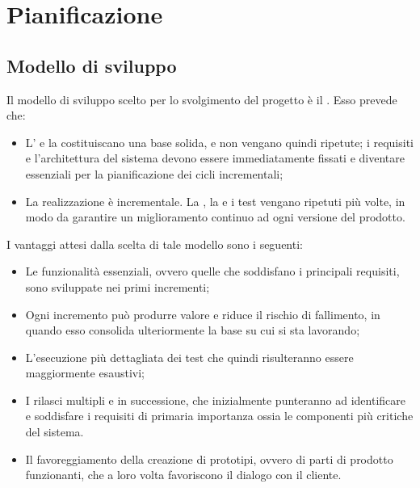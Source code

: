 \newpage
\section{Pianificazione}

\subsection{Modello di sviluppo}
Il modello di sviluppo scelto per lo svolgimento del progetto è il . Esso prevede che:
\begin{itemize}
	\item L' e la  costituiscano una base solida, e non vengano quindi ripetute; i requisiti e l'architettura del sistema devono essere immediatamente fissati e diventare essenziali per la pianificazione dei cicli incrementali;
	\item La realizzazione è incrementale. La , la  e i test vengano ripetuti più volte, in modo da garantire un miglioramento continuo ad ogni versione del prodotto.
\end{itemize}

I vantaggi attesi dalla scelta di tale modello sono i seguenti:
\begin{itemize}
	\item Le funzionalità essenziali, ovvero quelle che soddisfano i principali requisiti, sono sviluppate nei primi incrementi;
	\item Ogni incremento può produrre valore e riduce il rischio di fallimento, in quando esso consolida ulteriormente la base su cui si sta lavorando;
	\item L'esecuzione più dettagliata dei test che quindi risulteranno essere maggiormente esaustivi;
	\item I rilasci multipli e in successione, che inizialmente punteranno ad identificare e soddisfare i requisiti di primaria importanza ossia le componenti più critiche del sistema. 
	\item Il favoreggiamento della creazione di prototipi, ovvero di parti di prodotto funzionanti, che a loro volta favoriscono il dialogo con il cliente.
\end{itemize}

